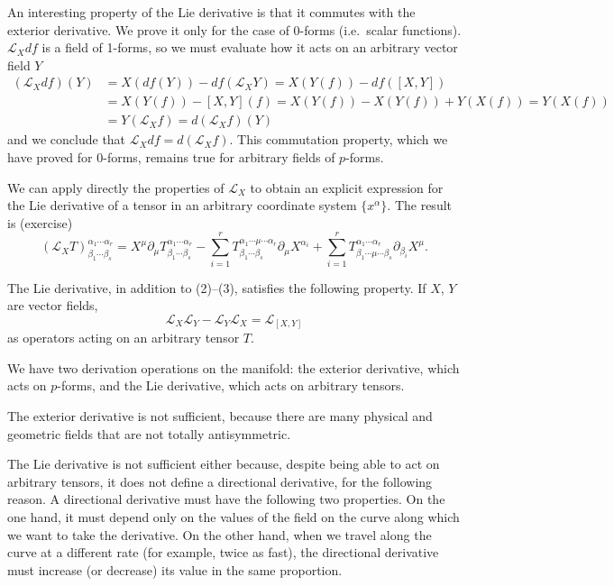 \begin{points}
\item An interesting property of the Lie derivative is that it commutes with the exterior derivative. We prove it only for the case of 0-forms (i.e.\ scalar functions). $\mathcal L_Xdf$ is a field of 1-forms, so we must evaluate how it acts on an arbitrary vector field $Y$
\begin{align*}
  (\mathcal L_Xdf)(Y)&=X(df(Y))-df(\mathcal L_XY)=X(Y(f))-df([X,Y])\\
  &=X(Y(f))-[X,Y](f)=X(Y(f))-X(Y(f))+Y(X(f))=Y(X(f))\\
  &=Y(\mathcal L_Xf)=d(\mathcal L_Xf)(Y)
\end{align*}
and we conclude that $\mathcal L_Xdf=d(\mathcal L_Xf)$. This commutation property, which we have proved for 0-forms, remains true for arbitrary fields of $p$-forms.

\item We can apply directly the properties of $\mathcal L_X$ to obtain an explicit expression for the Lie derivative of a tensor in an arbitrary coordinate system $\{x^\alpha\}$. The result is (exercise)
\[
  (\mathcal L_XT)^{\alpha_1\cdots\alpha_r}_{\beta_1\cdots\beta_s}=X^\mu\partial_\mu T^{\alpha_1\cdots\alpha_r}_{\beta_1\cdots\beta_s}-\sum_{i=1}^rT^{\alpha_1\cdots\mu\cdots\alpha_r}_{\beta_1\cdots\beta_s}\partial_\mu X^{\alpha_i}+\sum_{i=1}^rT^{\alpha_1\cdots\alpha_r}_{\beta_1\cdots\mu\cdots\beta_s}\partial_{\beta_i}X^\mu .
\]

\item The Lie derivative, in addition to (2)--(3), satisfies the following property. If $X$, $Y$ are vector fields,
\[
  \mathcal L_X\mathcal L_Y-\mathcal L_Y\mathcal L_X=\mathcal L_{[X,Y]}
\]
as operators acting on an arbitrary tensor $T$.


\item We have two derivation operations on the manifold: the exterior derivative, which acts on $p$-forms, and the Lie derivative, which acts on arbitrary tensors.

\item The exterior derivative is not sufficient, because there are many physical and geometric fields that are not totally antisymmetric.

\item The Lie derivative is not sufficient either because, despite being able to act on arbitrary tensors, it does not define a directional derivative, for the following reason. A directional derivative must have the following two properties. On the one hand, it must depend only on the values of the field on the curve along which we want to take the derivative. On the other hand, when we travel along the curve at a different rate (for example, twice as fast), the directional derivative must increase (or decrease) its value in the same proportion.


\end{points}
